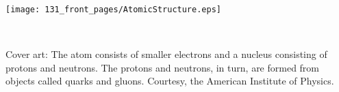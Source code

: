 \begin{center}

\texttt{[image: 131\_front\_pages/AtomicStructure.eps]}

\end{center}

\thispagestyle{empty}

\newpage


\ 
\setcounter{page}{2}

\vfill

Cover art: The atom consists of smaller electrons and a nucleus consisting of protons and neutrons. The protons and neutrons, in turn, are formed from objects called quarks and gluons. Courtesy, the American Institute of Physics.

\pagebreak
